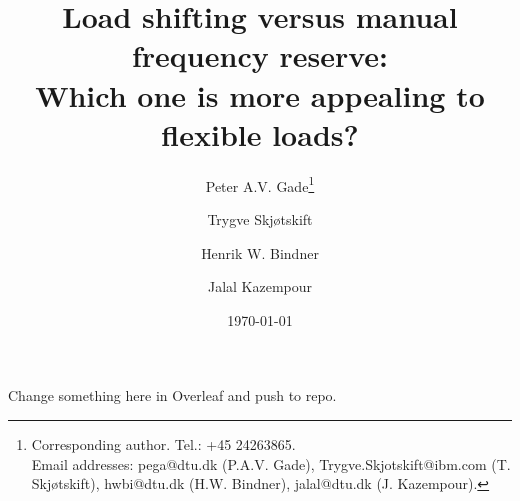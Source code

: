 \documentclass[11pt,a4paper]{article}
\begin{document}
\title{
    Load shifting versus manual frequency reserve: \\ Which one is more appealing to flexible loads?
}
\author[1,2]{Peter A.V. Gade\footnote{Corresponding author. Tel.: +45 24263865. \\ Email addresses: pega@dtu.dk (P.A.V. Gade), Trygve.Skjotskift@ibm.com (T. Skjøtskift), hwbi@dtu.dk (H.W. Bindner), jalal@dtu.dk (J. Kazempour).}}
\author[2]{Trygve Skjøtskift}
\author[1]{Henrik W. Bindner}
\author[1]{Jalal Kazempour}
\renewcommand\Affilfont{\itshape\small}

\date{\today}
{\let\newpage\relax\maketitle}



Change something here in Overleaf and push to repo.






\end{document}
